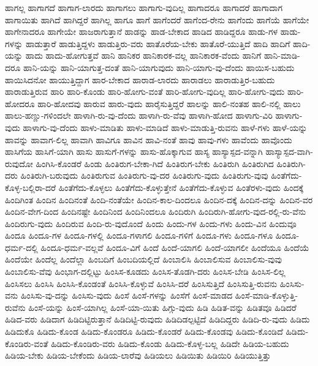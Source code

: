 {ಹಾಗಲ್ಲ
ಹಾಗಾಗದೆ
ಹಾಗಾಗ-ಲಾರದು
ಹಾಗಾಗಲು
ಹಾಗಾಗು-ವುದಿಲ್ಲ
ಹಾಗಾದರೂ
ಹಾಗಾದರೆ
ಹಾಗಾದಾಗ
ಹಾಗಾಯಿತು
ಹಾಗಿದೆ
ಹಾಗಿದ್ದರೆ
ಹಾಗಿಲ್ಲ
ಹಾಗೂ
ಹಾಗೆ
ಹಾಗೆಂದರೆ
ಹಾಗೆಂದ-ರೇನು
ಹಾಗೆಂದು
ಹಾಗೆಯೆ
ಹಾಗೆಯೇ
ಹಾಗೇನಾದರೂ
ಹಾಗೇಯೇ
ಹಾಜರಾಗುತ್ತಾನೆ
ಹಾಡನ್ನು
ಹಾಡ-ಬೇಕಾದ
ಹಾಡಿದ
ಹಾಡಿದ್ದರೂ
ಹಾಡು-ಗಳ
ಹಾಡು-ಗಳನ್ನು
ಹಾಡುತ್ತಾರೆ
ಹಾಡುತ್ತಿದ್ದಳು
ಹಾಡುತ್ತಿರು-ವರು
ಹಾತೊರೆಯ-ಬೇಕು
ಹಾತೊರೆ-ಯುತ್ತಿದೆ
ಹಾದಿ
ಹಾದಿಗೆ
ಹಾದಿ-ಯನ್ನು
ಹಾದು
ಹಾದು-ಹೋಗುತ್ತವೆ
ಹಾನಿ
ಹಾನಿಕರ
ಹಾನಿಕಾರಕ-ವಲ್ಲ
ಹಾನಿಕಾರಕ-ವೆಂದು
ಹಾನಿಗೆ
ಹಾನಿ-ಮಾಡಿ-ದರೂ
ಹಾನಿ-ಯನ್ನು
ಹಾನಿ-ಯಾಗುತ್ತ-ದಂತೆ
ಹಾನಿ-ಯಾಗುವುದು
ಹಾನಿ-ಯಾಗು-ವು-ದೆಂದು
ಹಾಯಿಸ-ಬಹುದು
ಹಾಯಿಸಿದನೋ
ಹಾಯುತ್ತಿದ್ದಾಗ
ಹಾರ-ಬೇಕಾದ
ಹಾರಾಡ-ಲಾರದು
ಹಾರಾಡಲು
ಹಾರಾಡುತ್ತಿರ-ಬಹುದು
ಹಾರಾಡುತ್ತಿರುವ
ಹಾರಿ
ಹಾರಿ-ಕೊಂಡು
ಹಾರಿ-ಹೋಗು-ವಂತೆ
ಹಾರಿ-ಹೋಗು-ವುದಿಲ್ಲ
ಹಾರಿ-ಹೋಗು-ವುದು
ಹಾರಿ-ಹೋದರೂ
ಹಾರಿ-ಹೋದವು
ಹಾರುವ
ಹಾರು-ವುದು
ಹಾರೈಸುತ್ತಿದ್ದರೆ
ಹಾಲನ್ನು
ಹಾಲಿ-ನಂತಹ
ಹಾಲಿ-ನಲ್ಲಿ
ಹಾಲು
ಹಾಲು-ಹಣ್ಣು-ಗಳಿಂದಲೇ
ಹಾಳಾಗಿ-ರು-ವು-ದೆಂದು
ಹಾಳಾಗಿ-ರು-ವೆವು
ಹಾಳಾಗಿ-ಹೋದ
ಹಾಳಾಗು-ವಿರಿ
ಹಾಳಾಗು-ವುದು
ಹಾಳಾಗು-ವು-ದೆಂದು
ಹಾಳು-ಮಾಡಿತು
ಹಾಳು-ಮಾಡಿದೆ
ಹಾಳು-ಮಾಡುತ್ತಿ-ರುವನು
ಹಾಳೆ-ಗಳು
ಹಾಳೆ-ಯನ್ನು
ಹಾವನ್ನು
ಹಾವಾಗ-ಲಿಲ್ಲ
ಹಾವಾಗಿ
ಹಾವಿಗೂ
ಹಾವಿನ
ಹಾವಿ-ನಂತೆ
ಹಾವು
ಹಾವು-ಗಳು
ಹಾವೆಂದು
ಹಾವೊಂದು
ಹಾಸಿಗೆಯ
ಹಾಸಿಗೆ-ಯಾಗಿ
ಹಾಸು
ಹಾಸುಗೆ-ಗಳನ್ನು
ಹಾಸು-ಹೊಕ್ಕಾಗುವ
ಹಾಸ್ಯ
ಹಾಸ್ಯಾಸ್ಪದ-ವನ್ನಾಗಿ
ಹಾಸ್ಯಾಸ್ಪದ-ವಾಗಿ-ರುವುದೋ
ಹಿಂಗಿಸಿ-ಕೊಂಡರೆ
ಹಿಂಡು
ಹಿಂತಿರುಗ-ಬೇಕಾ-ಗಿದೆ
ಹಿಂತಿರುಗ-ಬೇಕು
ಹಿಂತಿರುಗಿ
ಹಿಂತಿರುಗಿದ
ಹಿಂತಿರುಗಿ-ದರು
ಹಿಂತಿರುಗಿ-ಬರುವುದು
ಹಿಂತಿರುಗುವ
ಹಿಂತಿರುಗು-ವು-ದರ
ಹಿಂತಿರುಗು-ವುದು
ಹಿಂತಿರುಗು-ವುವು
ಹಿಂತೆಗೆದು-ಕೊಳ್ಳ-ಬಲ್ಲಿರಾ-ದರೆ
ಹಿಂತೆಗೆದು-ಕೊಳ್ಳಲು
ಹಿಂತೆಗೆದು-ಕೊಳ್ಳುತ್ತೇನೆ
ಹಿಂತೆಗೆದು-ಕೊಳ್ಳುವ
ಹಿಂತೆರಳು-ವುದು
ಹಿಂದಕ್ಕೆ
ಹಿಂದಿಗಿಂತ
ಹಿಂದಿನ
ಹಿಂದಿನಂತೆ
ಹಿಂದಿ-ನಂತೆಯೇ
ಹಿಂದಿನ-ಕಾಲ-ದಿಂದಲೂ
ಹಿಂದಿನ-ದಕ್ಕೆ
ಹಿಂದಿನ-ದನ್ನು
ಹಿಂದಿನ-ವರ
ಹಿಂದಿನ-ವೇಗ-ದಿಂದ
ಹಿಂದಿನಷ್ಟೇ
ಹಿಂದಿನಿಂದ
ಹಿಂದಿನಿಂದಲೂ
ಹಿಂದಿರುಗಿ
ಹಿಂದಿರುಗಿ-ಹೋಗು-ವುದ-ರಲ್ಲಿ-ರು-ವೆನು
ಹಿಂದಿರುಗು-ವುದು
ಹಿಂದಿರುವ
ಹಿಂದಿ-ರು-ವುದೊಂದೆ
ಹಿಂದು
ಹಿಂದು-ಗಳ
ಹಿಂದು-ಗಳು
ಹಿಂದು-ವಿನ
ಹಿಂದುವೂ
ಹಿಂದೂ
ಹಿಂದೂ-ಗಳ
ಹಿಂದೂ-ಗಳಲ್ಲಿ
ಹಿಂದೂ-ಗಳಾಗಲಿ
ಹಿಂದೂ-ಗಳಿಗೆ
ಹಿಂದೂ-ಗಳು
ಹಿಂದೂ-ಗಳೂ
ಹಿಂದೂ-ಧರ್ಮ-ದಲ್ಲಿ
ಹಿಂದೂ-ಧರ್ಮ-ವಲ್ಲವೆ
ಹಿಂದೂ-ವಿಗೆ
ಹಿಂದೆ
ಹಿಂದೆ-ಯಾಗಲಿ
ಹಿಂದೆ-ಯಾಗಲೀ
ಹಿಂದೆಯೂ
ಹಿಂದೆಯೆ
ಹಿಂದೆಯೇ
ಹಿಂದೆಲ್ಲ
ಹಿಂದೆಲ್ಲಾ
ಹಿಂಬದಿಗೆ
ಹಿಂಬದಿಯಲ್ಲಿದೆ
ಹಿಂಬಾಲಿಸಿ
ಹಿಂಬಾಲಿಸುವ
ಹಿಂಬಾಲಿಸು-ವುವು
ಹಿಂಬಾಲಿಸು-ವೆವು
ಹಿಂಭಾಗ-ದಲ್ಲಿಟ್ಟು
ಹಿಂಸಿಸ-ಕೂಡದು
ಹಿಂಸಿಸ-ತೊಡಗಿ-ದರು
ಹಿಂಸಿಸ-ಬೇಡಿ
ಹಿಂಸಿಸ-ಲಿಲ್ಲ
ಹಿಂಸಿಸಲು
ಹಿಂಸಿಸಿ
ಹಿಂಸಿಸಿ-ಕೊಂಡಂತೆ
ಹಿಂಸಿಸಿ-ಕೊಳ್ಳುವೆ
ಹಿಂಸಿಸಿ-ದರೆ
ಹಿಂಸಿಸುತ್ತಿದೆ
ಹಿಂಸಿಸುತ್ತಿ-ರುವನು
ಹಿಂಸಿಸು-ವನು
ಹಿಂಸಿಸು-ವು-ದನ್ನು
ಹಿಂಸಿಸು-ವುದು
ಹಿಂಸೆ
ಹಿಂಸೆ-ಗಳನ್ನು
ಹಿಂಸೆಗೆ
ಹಿಂಸೆ-ಮಾಡದ
ಹಿಂಸೆ-ಮಾಡಿ-ಕೊಳ್ಳುತ್ತಿ-ರುವೆನು
ಹಿಂಸೆ-ಯನ್ನು
ಹಿಂಸೆ-ಯಾಗಿಲ್ಲ
ಹಿಂಸೆ-ಯಾ-ಯಿತು
ಹಿಗ್ಗು-ವುದು
ಹಿಡಿ
ಹಿಡಿತ-ವನ್ನು
ಹಿಡಿತವೂ
ಹಿಡಿದರೆ
ಹಿಡಿದ-ವರು
ಹಿಡಿದಾಗ
ಹಿಡಿದಿಟ್ಟಿರುತ್ತಾನೆ
ಹಿಡಿದಿಟ್ಟಿ-ರುವುದು
ಹಿಡಿದಿಡಲ್ಪಟ್ಟಿದೆ
ಹಿಡಿದಿದ್ದರು
ಹಿಡಿದಿ-ರು-ವುದು
ಹಿಡಿದು
ಹಿಡಿದುಕೊ
ಹಿಡಿದು-ಕೊಂಡ
ಹಿಡಿದು-ಕೊಂಡರೂ
ಹಿಡಿದು-ಕೊಂಡರೆ
ಹಿಡಿದು-ಕೊಂಡವು
ಹಿಡಿದು-ಕೊಂಡಿದೆ
ಹಿಡಿದು-ಕೊಂಡಿರು-ವಂತೆ
ಹಿಡಿದು-ಕೊಂಡಿರು-ವರು
ಹಿಡಿದು-ಕೊಂಡು
ಹಿಡಿದು-ಕೊಳ್ಳ-ಬಲ್ಲ
ಹಿಡಿದೇ
ಹಿಡಿಯ-ಬಹುದು
ಹಿಡಿಯ-ಬೇಕು
ಹಿಡಿಯ-ಬೇಕೆಂದು
ಹಿಡಿಯ-ಲಾರೆವು
ಹಿಡಿಯಲು
ಹಿಡಿಯಿತು
ಹಿಡಿಯಿರಿ
ಹಿಡಿಯುತ್ತಿತ್ತು
}

